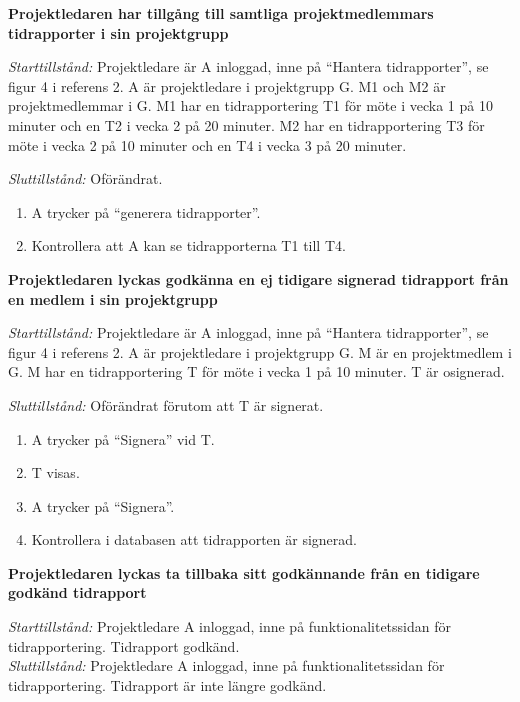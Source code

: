 \documentclass[a4paper]{article}
\begin{document}
\begin{FT}

\item
\textbf{Projektledaren har tillgång till samtliga projektmedlemmars tidrapporter i sin projektgrupp}

\emph{Starttillstånd:} Projektledare är A inloggad, inne på ``Hantera tidrapporter'', se figur 4 i referens 2. A är projektledare i projektgrupp G. M1 och M2 är projektmedlemmar i G. M1 har en tidrapportering T1 för möte i vecka 1 på 10 minuter och en T2 i vecka 2 på 20 minuter. M2 har en tidrapportering T3 för möte i vecka 2 på 10 minuter och en T4 i vecka 3 på 20 minuter. 

\emph{Sluttillstånd:} Oförändrat.

\begin{enumerate}
\item A trycker på ``generera tidrapporter''.
\item Kontrollera att A kan se tidrapporterna T1 till T4.
\end{enumerate}


\item
\textbf{Projektledaren lyckas godkänna en ej tidigare signerad tidrapport från en medlem i sin projektgrupp}

\emph{Starttillstånd:} Projektledare är A inloggad, inne på ``Hantera tidrapporter'', se figur 4 i referens 2. A är projektledare i projektgrupp G. M är en projektmedlem i G. M har en tidrapportering T för möte i vecka 1 på 10 minuter. T är osignerad.

\emph{Sluttillstånd:} Oförändrat förutom att T är signerat.

\begin{enumerate}
\item A trycker på ``Signera'' vid T.
\item T visas.
\item A trycker på ``Signera''.
\item Kontrollera i databasen att tidrapporten är signerad.
\end{enumerate}


\item
\textbf{Projektledaren lyckas ta tillbaka sitt godkännande från en tidigare godkänd tidrapport}

\emph{Starttillstånd:} Projektledare A inloggad, inne på funktionalitetssidan för tidrapportering. Tidrapport godkänd.\\
\emph{Sluttillstånd:} Projektledare A inloggad, inne på funktionalitetssidan för tidrapportering. Tidrapport är inte längre godkänd.


\end{FT}
\end{document}
